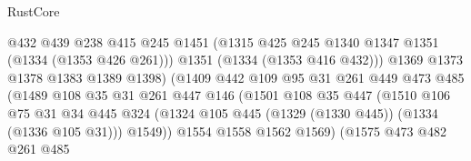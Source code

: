 \begin{lexlean}{RustCore}
\begin{coremodule}
                                      @432
                                      @439
                                      @238
                                      @415
                                      @245
                                      @1451
                                      (@1315 @425 @245 @1340 @1347 @1351 (@1334 (@1353 @426 @261)))
                                      @1351
                                      (@1334 (@1353 @416 @432)))
                                    @1369
                                    @1373
                                    @1378
                                    @1383
                                    @1389
                                    @1398)
                                  (@1409
                                    @442
                                    @109
                                    @95
                                    @31
                                    @261
                                    @449
                                    @473
                                    @485
                                    (@1489
                                      @108
                                      @35
                                      @31
                                      @261
                                      @447
                                      @146
                                      (@1501
                                        @108
                                        @35
                                        @447
                                        (@1510
                                          @106
                                          @75
                                          @31
                                          @34
                                          @445
                                          @324
                                          (@1324
                                            @105
                                            @445
                                            (@1329 (@1330 @445))
                                            (@1334 (@1336 @105 @31)))
                                          @1549))
                                      @1554
                                      @1558
                                      @1562
                                      @1569)
                                    (@1575
                                      @473
                                      @482
                                      @261
                                      @485

\end{coremodule}
\end{lexlean}
